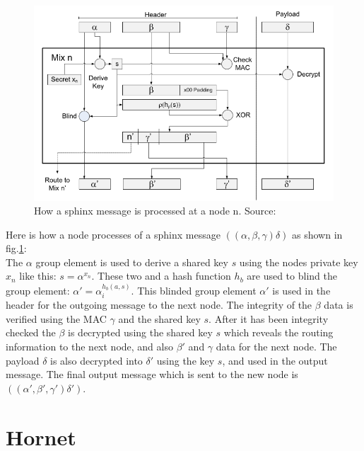 \documentclass[informationsecurity]{gucmasterproject}
\begin{document}
\begin{figure}[h]
    \centering
    \includegraphics[width=12cm]{figs/sphinx.png}
    \caption{ How a sphinx message is processed at a node n. Source: \cite{danezis2009sphinx}}
    \label{fig:sphinx}
\end{figure}

\noindent
Here is how a node processes of a sphinx message $((\alpha, \beta, \gamma)\delta)$ as shown in fig.\ref{fig:sphinx}:\\
The $\alpha$ group element is used to derive a shared key $s$ using the nodes private key $x_n$ like this: $s = \alpha^{x_n}$.
These two and a hash function $h_b$ are used to blind the group element: $\alpha'= \alpha_i^{h_b(a,s)}$.
This blinded group element $\alpha'$ is used in the header for the outgoing message to the next node.
The integrity of the $\beta$ data is verified using the MAC $\gamma$ and the shared key $s$.
After it has been integrity checked the $\beta$ is decrypted using the shared key $s$ which reveals the routing information to the next node, and also $\beta'$ and $\gamma$ data for the next node. 
The payload $\delta$ is also decrypted into $\delta'$ using the key $s$, and used in the output message.
The final output message which is sent to the new node is $((\alpha', \beta', \gamma')\delta')$.


\section{Hornet}








%

\end{document}
